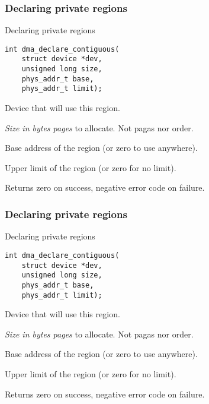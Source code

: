 \begin{frame}[fragile]
  \frametitle{Declaring private regions}

  \begin{block}{Declaring private regions}
\begin{lstlisting}
int dma_declare_contiguous(
    struct device *dev,
    unsigned long size,
    phys_addr_t base,
    phys_addr_t limit);
\end{lstlisting}
  \end{block}

  \begin{description}[count]
  \item[dev] Device that will use this region.
  \item[size] \emph{Size in bytes pages} to allocate. {\footnotesize Not
    pagas nor order.}
  \item[base] Base address of the region (or zero to use anywhere).
  \item[limit] Upper limit of the region (or zero for no limit).
  \item Returns zero on success, negative error code on failure.
  \end{description}
\end{frame}

\begin{frame}[fragile]
  \frametitle{Declaring private regions}

  \begin{block}{Declaring private regions}
\begin{lstlisting}
int dma_declare_contiguous(
    struct device *dev,
    unsigned long size,
    phys_addr_t base,
    phys_addr_t limit);
\end{lstlisting}
  \end{block}

  \begin{description}[count]
  \item[dev] Device that will use this region.
  \item[size] \emph{Size in bytes pages} to allocate. {\footnotesize Not
    pagas nor order.}
  \item[base] Base address of the region (or zero to use anywhere).
  \item[limit] Upper limit of the region (or zero for no limit).
  \item Returns zero on success, negative error code on failure.
  \end{description}
\end{frame}

